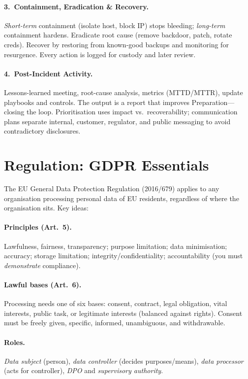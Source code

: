 \paragraph{3.~Containment, Eradication \& Recovery.} \emph{Short-term} containment (isolate host, block IP) stops bleeding; \emph{long-term} containment hardens. Eradicate root cause (remove backdoor, patch, rotate creds). Recover by restoring from known-good backups and monitoring for resurgence. Every action is logged for custody and later review.
\paragraph{4.~Post-Incident Activity.} Lessons-learned meeting, root-cause analysis, metrics (MTTD/MTTR), update playbooks and controls. The output is a report that improves Preparation---closing the loop.
Prioritisation uses impact vs.\ recoverability; communication plans separate internal, customer, regulator, and public messaging to avoid contradictory disclosures.
\section{Regulation: GDPR Essentials}
\label{sec:gdpr}
The EU General Data Protection Regulation (2016/679) applies to any organisation processing personal data of EU residents, regardless of where the organisation sits. Key ideas:
\paragraph{Principles (Art.~5).} Lawfulness, fairness, transparency; purpose limitation; data minimisation; accuracy; storage limitation; integrity/confidentiality; accountability (you must \emph{demonstrate} compliance).
\paragraph{Lawful bases (Art.~6).} Processing needs one of six bases: consent, contract, legal obligation, vital interests, public task, or legitimate interests (balanced against rights). Consent must be freely given, specific, informed, unambiguous, and withdrawable.
\paragraph{Roles.} \emph{Data subject} (person), \emph{data controller} (decides purposes/means), \emph{data processor} (acts for controller), \emph{DPO} and \emph{supervisory authority}.
